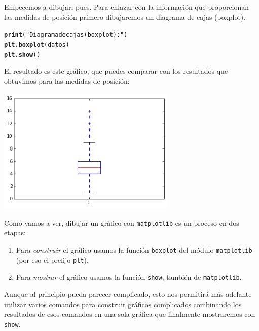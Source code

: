 \documentclass[10pt,a4paper]{article}\usepackage[]{graphicx}\usepackage[]{color}
\makeatletter
\newcommand{\hlstr}[1]{\textcolor[rgb]{0.192,0.494,0.8}{#1}}%
\newcommand{\hlstd}[1]{\textcolor[rgb]{0.345,0.345,0.345}{#1}}%
\newcommand{\hlkwd}[1]{\textcolor[rgb]{0.737,0.353,0.396}{\textbf{#1}}}%
\newenvironment{kframe}{%
 \def\at@end@of@kframe{}%
 \ifinner\ifhmode%
  \def\at@end@of@kframe{\end{minipage}}%
  \begin{minipage}{\columnwidth}%
 \fi\fi%
 \def\FrameCommand##1{\hskip\@totalleftmargin \hskip-\fboxsep
 \colorbox{shadecolor}{##1}\hskip-\fboxsep
     \hskip-\linewidth \hskip-\@totalleftmargin \hskip\columnwidth}%
 \MakeFramed {\advance\hsize-\width
   \@totalleftmargin\z@ \linewidth\hsize
   \@setminipage}}%
 {\par\unskip\endMakeFramed%
 \at@end@of@kframe}
\newenvironment{knitrout}{}{} %
\makeatother
\begin{document}
Empecemos a dibujar, pues. Para enlazar con la información que proporcionan las medidas de posición primero dibujaremos un diagrama de cajas (boxplot).
\begin{knitrout}
\color{fgcolor}\begin{kframe}
\begin{alltt}
\hlkwd{print}\hlstd{(}\hlstr{"Diagrama de cajas (boxplot):"}\hlstd{)}
\hlkwd{plt.boxplot}\hlstd{(datos)}
\hlkwd{plt.show}\hlstd{()}
\end{alltt}
\end{kframe}
\end{knitrout}
El resultado es este gráfico, que puedes comparar con los resultados que obtuvimos para las medidas de posición:
\begin{center}
\includegraphics[height=6cm]{../fig/Tut-02-py-03-boxplot.png}
\end{center}
Como vamos a ver, dibujar un gráfico con {\tt matplotlib} es un proceso en dos etapas:
\begin{enumerate}
\item Para {\em construir} el gráfico usamos la función {\tt boxplot} del módulo {\tt matplotlib} (por eso el prefijo {\tt plt}).
\item Para {\em mostrar} el gráfico usamos la función {\tt show}, también de {\tt matplotlib}.
\end{enumerate}
Aunque al principio pueda parecer complicado, esto nos permitirá más adelante utilizar varios comandos para construir gráficos complicados combinando los resultados de esos comandos en una sola gráfica que finalmente mostraremos con {\tt show}.
\end{document}
